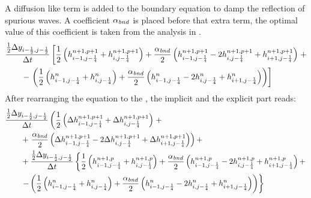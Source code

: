 A diffusion like term is added to the boundary equation to damp the reflection of spurious waves.
A coefficient $\alpha_{\it bnd}$ is placed before that extra term, the optimal value of this coefficient is taken from the analysis in \citet{transpeq-analysisdiscretizationinsidedomain_boundaries.mw}.
\begin{align}
    & \frac{\frac{1}{2}\Delta y_{i-\frac{1}{2}, j-\frac{1}{2}}}{\Delta t}\left[ \frac{1}{2} \left( h^{n+1,p+1}_{i-1, j-\frac{1}{4}} + h^{n+1,p+1}_{i, j-\frac{1}{4}} \right)
    + \frac{\alpha_{\it bnd}}{2} \left( h^{n+1,p+1}_{i-1, j-\frac{1}{4}} - 2 h^{n+1,p+1}_{i, j-\frac{1}{4}} + h^{n+1,p+1}_{i+1, j-\frac{1}{4}}  \right) \right. +
    \nonumber \\*
    & \qquad  - \left. \left(
    \frac{1}{2} \left( h^{n}_{i-1, j-\frac{1}{4}} + h^{n}_{i, j-\frac{1}{4}} \right)
    + \frac{\alpha_{\it bnd}}{2}  \left( h^{n}_{i-1, j-\frac{1}{4}} - 2 h^{n}_{i, j-\frac{1}{4}} + h^{n}_{i+1, j-\frac{1}{4}}  \right) \right)
    \right]
\end{align}
After rearranging the equation to the \deltaformulation, the implicit and the explicit part reads:
\begin{align}
    & \frac{\frac{1}{2}\Delta y_{i-\frac{1}{2}, j-\frac{1}{2}}}{\Delta t}  \left( \frac{1}{2} \left( \Delta h^{n+1, p+1}_{i-1, j-\frac{1}{4}} + \Delta h^{n+1, p+1}_{i, j-\frac{1}{4}} \right) \right. +
    \nonumber \\*
    & \qquad + \left. \frac{\alpha_{\it bnd}}{2}\left( \Delta h^{n+1,p+1}_{i-1, j-\frac{1}{4}} - 2 \Delta h^{n+1,p+1}_{i, j-\frac{1}{4}} + \Delta h^{n+1,p+1}_{i+1, j-\frac{1}{4}} \right) \right) +
    \nonumber \\
    & \qquad + \frac{\frac{1}{2}\Delta y_{i-\frac{1}{2}, j-\frac{1}{2}}}{\Delta t} \left\{ \frac{1}{2} \left( h^{n+1, p}_{i-1, j-\frac{1}{4}} + h^{n+1, p}_{i, j-\frac{1}{4}} \right)
    + \frac{\alpha_{\it bnd}}{2}\left(  h^{n+1,p}_{i-1, j-\frac{1}{4}} - 2 h^{n+1,p}_{i, j-\frac{1}{4}}  + h^{n+1,p}_{i+1, j-\frac{1}{4}} \right) + \right.
    \nonumber \\*
    &
    \qquad \left. - \left( \frac{1}{2} \left( h^{n}_{i-1, j-\frac{1}{4}} + h^{n}_{i, j-\frac{1}{4}} \right)
    + \frac{\alpha_{\it bnd}}{2}  \left( h^{n}_{i-1, j-\frac{1}{4}} - 2 h^{n}_{i, j-\frac{1}{4}} + h^{n}_{i+1, j-\frac{1}{4}}  \right) \right) \right\}
\end{align}
